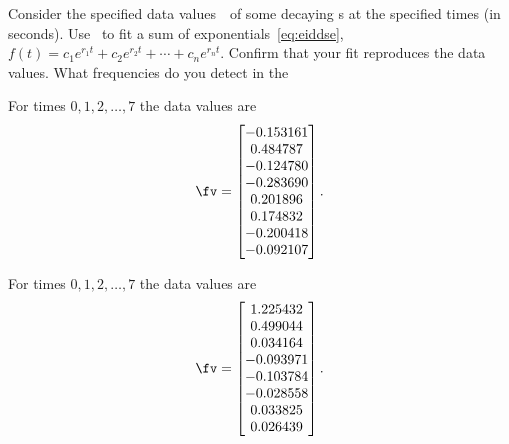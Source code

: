 \begin{exercise}  
Consider the specified data values~\fv\ of some decaying s at the specified times (in seconds).
Use \script\ to fit a sum of exponentials~\eqref{eq:eiddse}, \(f(t)=c_1e^{r_1t}+c_2e^{r_2t}+\cdots+c_ne^{r_nt}\).
Confirm that your fit reproduces the data values.
What frequencies do you detect in the 
\begin{Parts}
\item  For times \(0,1,2,\ldots,7\) the data values are 
\setbox\ajrqrbox\hbox{}\marginajrbox%
\[ \fv=\begin{bmatrix} -0.153161
\\  0.484787
\\ -0.124780
\\ -0.283690
\\  0.201896
\\  0.174832
\\ -0.200418
\\ -0.092107 \end{bmatrix}.\]
  
\item  For times \(0,1,2,\ldots,7\) the data values are 
\setbox\ajrqrbox\hbox{}\marginajrbox%
\[ \fv=\begin{bmatrix} 1.225432
\\  0.499044
\\  0.034164
\\ -0.093971
\\ -0.103784
\\ -0.028558
\\  0.033825
\\  0.026439 \end{bmatrix}.\]
  

\end{Parts}
\end{exercise}

